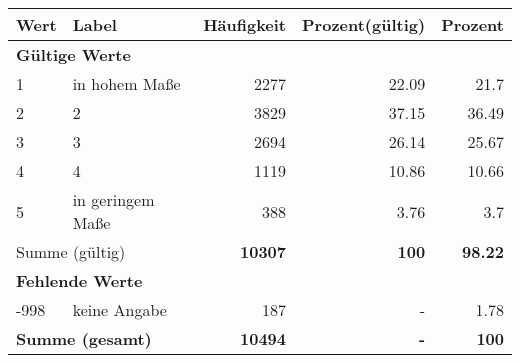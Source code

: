      \begin{longtable}{lXrrr}
     \toprule
     \textbf{Wert} & \textbf{Label} & \textbf{Häufigkeit} & \textbf{Prozent(gültig)} & \textbf{Prozent} \\
     \endhead
     \midrule
     \multicolumn{5}{l}{\textbf{Gültige Werte}}\\

     1 &
     \multicolumn{1}{X}{ in hohem Maße   } &


       \num{2277} &
       \num[round-mode=places,round-precision=2]{22.09} &
         \num[round-mode=places,round-precision=2]{21.7} \\

     2 &
     \multicolumn{1}{X}{ 2   } &


       \num{3829} &
       \num[round-mode=places,round-precision=2]{37.15} &
         \num[round-mode=places,round-precision=2]{36.49} \\

     3 &
     \multicolumn{1}{X}{ 3   } &


       \num{2694} &
       \num[round-mode=places,round-precision=2]{26.14} &
         \num[round-mode=places,round-precision=2]{25.67} \\

     4 &
     \multicolumn{1}{X}{ 4   } &


       \num{1119} &
       \num[round-mode=places,round-precision=2]{10.86} &
         \num[round-mode=places,round-precision=2]{10.66} \\

     5 &
     \multicolumn{1}{X}{ in geringem Maße   } &


       \num{388} &
       \num[round-mode=places,round-precision=2]{3.76} &
         \num[round-mode=places,round-precision=2]{3.7} \\
     \midrule
     \multicolumn{2}{l}{Summe (gültig)} &
       \textbf{\num{10307}} &
     \textbf{\num{100}} &
       \textbf{\num[round-mode=places,round-precision=2]{98.22}} \\
     \multicolumn{5}{l}{\textbf{Fehlende Werte}}\\
       -998 &
       keine Angabe &
         \num{187} &
        - &
         \num[round-mode=places,round-precision=2]{1.78} \\
     \midrule
     \multicolumn{2}{l}{\textbf{Summe (gesamt)}} &
          \textbf{\num{10494}} &
        \textbf{-} &
        \textbf{\num{100}} \\
     \bottomrule
     \end{longtable}
     
